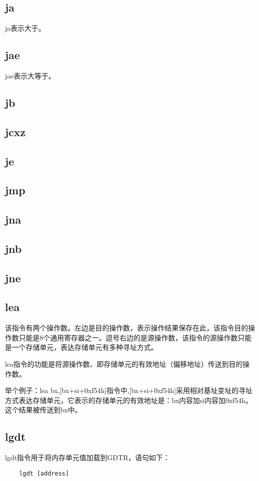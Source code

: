 \documentclass[a4paper,left=2.5cm,right=2.5cm,11pt]{article}
\begin{document}
\subsection{ja}
	ja表示大于。

\subsection{jae}
	jae表示大等于。

\subsection{jb}
\subsection{jcxz}
\subsection{je}
\subsection{jmp}
\subsection{jna}
\subsection{jnb}
\subsection{jne}
\subsection{lea}
	该指令有两个操作数。左边是目的操作数，表示操作结果保存在此，该指令目的操作数只能是8个通用寄存器之一。逗号右边的是源操作数，该指令的源操作数只能是一个存储单元，表达存储单元有多种寻址方式。\par

	lea指令的功能是将源操作数、即存储单元的有效地址（偏移地址）传送到目的操作数。\par

	举个例子：lea bx,[bx+si+0xf54h]指令中,[bx+si+0xf54h]采用相对基址变址的寻址方式表达存储单元，它表示的存储单元的有效地址是：bx内容加si内容加0xf54h。这个结果被传送到bx中。

\subsection{lgdt}
	lgdt指令用于将内存单元值加载到GDTR，语句如下：
	\begin{lstlisting}
	lgdt [address]
	\end{lstlisting}
\end{document}
